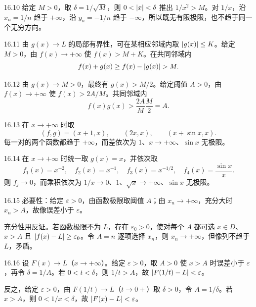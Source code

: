 \begin{solution}{16.10}
给定 \(M>0\)，取 \(\delta=1/\sqrt M\)，则 \(0<\left|x\right|<\delta\) 推出 \(1/x^2>M\)。对 \(1/x\)，沿 \(x_n=1/n\) 趋于 \(+\infty\)，沿 \(y_n=-1/n\) 趋于 \(-\infty\)，所以既无有限极限，也不趋于同一个无穷方向。
\end{solution}

\begin{solution}{16.11}
由 \(g(x)\to L\) 的局部有界性，可在某相应邻域内取 \(\left|g(x)\right|\le K\)。给定 \(M>0\)，由 \(f(x)\to+\infty\) 使 \(f(x)>M+K\)。在共同邻域内
\[
 f(x)+g(x)\ge f(x)-\abs{g(x)}>M.
\]
\end{solution}

\begin{solution}{16.12}
由 \(g(x)\to M>0\)，最终有 \(g(x)>M/2\)。给定阈值 \(A>0\)，由 \(f(x)\to+\infty\) 使 \(f(x)>2A/M\)。共同邻域内
\[
 f(x)g(x)>\frac{2A}{M}\frac M2=A.
\]
\end{solution}

\begin{solution}{16.13}
在 \(x\to+\infty\) 时取
\[
 (f,g)=(x+1,x),\qquad (2x,x),\qquad
 (x+\sin x,x).
\]
每一对的两个函数都趋于 \(+\infty\)，而差依次为 \(1\)、\(x\to+\infty\)、\(\sin x\) 无极限。
\end{solution}

\begin{solution}{16.14}
在 \(x\to+\infty\) 时统一取 \(g(x)=x\)，并依次取
\[
 f_1(x)=x^{-2},\quad f_2(x)=x^{-1},\quad
 f_3(x)=x^{-1/2},\quad f_4(x)=\frac{\sin x}{x}.
\]
则 \(f_j\to0\)，而乘积依次为 \(1/x\to0\)、\(1\)、\(\sqrt x\to+\infty\)、\(\sin x\) 无极限。
\end{solution}

\begin{solution}{16.15}
必要性：给定 \(\varepsilon>0\)，由函数极限取阈值 \(A\)；由 \(x_n\to+\infty\)，充分大时 \(x_n>A\)，故像误差小于 \(\varepsilon\)。

充分性用反证。若函数极限不为 \(L\)，存在 \(\varepsilon_0>0\)，使对每个 \(A\) 都可选 \(x\in D\)、\(x>A\) 且 \(\left|f(x)-L\right|\ge\varepsilon_0\)。令 \(A=n\) 逐项选择 \(x_n\)，则 \(x_n\to+\infty\)，但像列不趋于 \(L\)，矛盾。
\end{solution}

\begin{solution}{16.16}
设 \(F(x)\to L\)（\(x\to+\infty\)）。给定 \(\varepsilon>0\)，取 \(A>0\) 使 \(x>A\) 时误差小于 \(\varepsilon\)，再令 \(\delta=1/A\)。若 \(0<t<\delta\)，则 \(1/t>A\)，故 \(\left|F(1/t)-L\right|<\varepsilon\)。

反之，给定 \(\varepsilon>0\)，由 \(F(1/t)\to L\)（\(t\to0+\)）取 \(\delta>0\)，令 \(A=1/\delta\)。若 \(x>A\)，则 \(0<1/x<\delta\)，故 \(\left|F(x)-L\right|<\varepsilon\)。
\end{solution}

